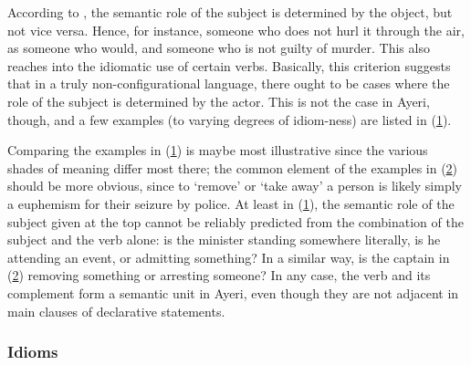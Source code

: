 According to \citet[129]{speas1990}, the semantic role of the subject is
determined by the object, but not vice versa. Hence, for instance, someone who
 does not hurl it through the air, as someone who
 would, and someone who  is not guilty of
murder. This also reaches into the idiomatic use of certain verbs. Basically,
this criterion suggests that in a truly non-configurational language, there
ought to be cases where the role of the subject is determined by the actor.
This is not the case in Ayeri, though, and a few examples (to varying degrees
of idiom-ness) are listed in (\ref{ex:ayrvbidm1}).

\begin{figure}[h]
\pex\label{ex:ayrvbidm1}%
\a {}
\a {}
\a {}
\xe
\end{figure}

\begin{figure}[h]
\pex\label{ex:ayrvbidm2}%
\a {}
\a {}
\xe
\end{figure}

Comparing the examples in (\ref{ex:ayrvbidm1}) is maybe most illustrative since
the various shades of meaning differ most there; the common element of the
examples in (\ref{ex:ayrvbidm2}) should be more obvious, since to `remove' or
`take away' a person is likely simply a euphemism for their seizure by police.
At least in (\ref{ex:ayrvbidm1}), the semantic role of the subject given at the
top cannot be reliably predicted from the combination of the subject and the
verb alone: is the minister standing somewhere literally, is he attending an
event, or admitting something? In a similar way, is the captain in
(\ref{ex:ayrvbidm2}) removing something or arresting someone? In any case, the
verb and its complement form a semantic unit in Ayeri, even though they are not
adjacent in main clauses of declarative statements.

\subsubsection{Idioms}

